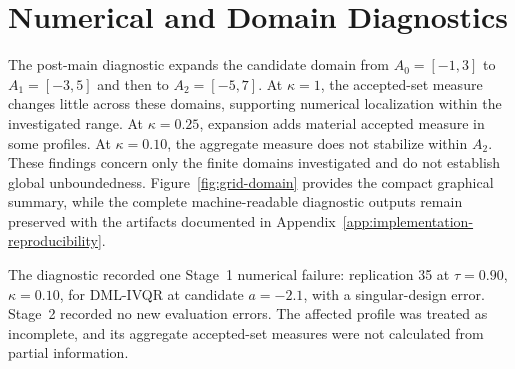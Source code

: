 \section{Numerical and Domain Diagnostics}
\label{app:numerical-domain-diagnostics}

The post-main diagnostic expands the candidate domain from $A_0=[-1,3]$ to $A_1=[-3,5]$ and then to $A_2=[-5,7]$. At $\kappa=1$, the accepted-set measure changes little across these domains, supporting numerical localization within the investigated range. At $\kappa=0.25$, expansion adds material accepted measure in some profiles. At $\kappa=0.10$, the aggregate measure does not stabilize within $A_2$. These findings concern only the finite domains investigated and do not establish global unboundedness. Figure~\ref{fig:grid-domain} provides the compact graphical summary, while the complete machine-readable diagnostic outputs remain preserved with the artifacts documented in Appendix~\ref{app:implementation-reproducibility}.

The diagnostic recorded one Stage~1 numerical failure: replication 35 at $\tau=0.90$, $\kappa=0.10$, for DML-IVQR at candidate $a=-2.1$, with a singular-design error. Stage~2 recorded no new evaluation errors. The affected profile was treated as incomplete, and its aggregate accepted-set measures were not calculated from partial information.
